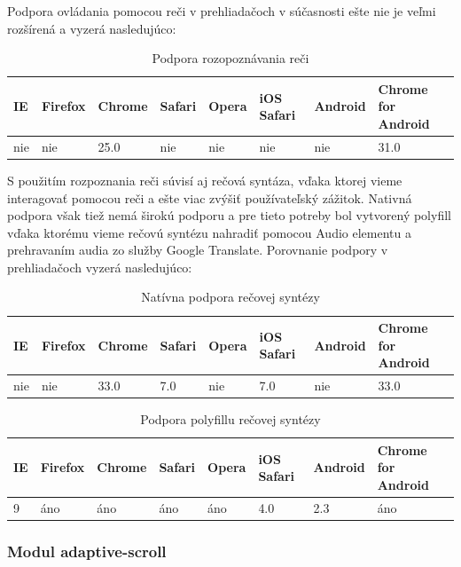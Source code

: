 Podpora ovládania pomocou reči v prehliadačoch v súčasnosti ešte nie je veľmi rozšírená a vyzerá nasledujúco:

\begin{table}[H]
  \begin{tabular}{ | l | l | l | l | l | l | l | l |}
    \hline
    IE & Firefox & Chrome & Safari & Opera & iOS Safari & Android & Chrome for Android \\ \hline
    nie & nie & 25.0 & nie & nie & nie & nie & 31.0  \\
    \hline
  \end{tabular}
  \caption[Podpora rozopoznávania reči]{Podpora rozopoznávania reči}
\end{table}

S použitím rozpoznania reči súvisí aj rečová syntáza, vďaka ktorej vieme interagovať pomocou reči a ešte viac zvýšiť používateľský zážitok. Nativná podpora však tiež nemá širokú podporu a pre tieto potreby bol vytvorený polyfill vďaka ktorému vieme rečovú syntézu nahradiť pomocou Audio elementu a prehravaním audia zo služby Google Translate. Porovnanie podpory v prehliadačoch vyzerá nasledujúco:

\begin{table}[H]
  \begin{tabular}{ | l | l | l | l | l | l | l | l |}
    \hline
    IE & Firefox & Chrome & Safari & Opera & iOS Safari & Android & Chrome for Android \\ \hline
    nie & nie & 33.0 & 7.0 & nie & 7.0 & nie & 33.0  \\
    \hline
  \end{tabular}
  \caption[Natívna podpora rečovej syntézy]{Natívna podpora rečovej syntézy}
\end{table}

\begin{table}[H]
  \begin{tabular}{ | l | l | l | l | l | l | l | l |}
    \hline
    IE & Firefox & Chrome & Safari & Opera & iOS Safari & Android & Chrome for Android \\ \hline
    9 & áno & áno & áno & áno & 4.0 & 2.3 & áno  \\
    \hline
  \end{tabular}
  \caption[Podpora polyfillu rečovej syntézy]{Podpora polyfillu rečovej syntézy}
\end{table}


\subsubsection{Modul adaptive-scroll} %
\label{sub:adaptive_scroll}

